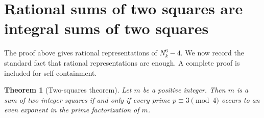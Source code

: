 \documentclass[11pt]{article}
\newtheorem{theorem}{Theorem}[section]
\theoremstyle{remark}
\begin{document}
\section{Rational sums of two squares are integral sums of two squares}

The proof above gives rational representations of \(N_k^6-4\).  We now record
the standard fact that rational representations are enough.  A complete proof is
included for self-containment.

\begin{theorem}[Two-squares theorem]\label{thm:two-squares}
Let \(m\) be a positive integer.  Then \(m\) is a sum of two integer squares if
and only if every prime \(p\equiv3\pmod4\) occurs to an even exponent in the
prime factorization of \(m\).
\end{theorem}
\end{document}
